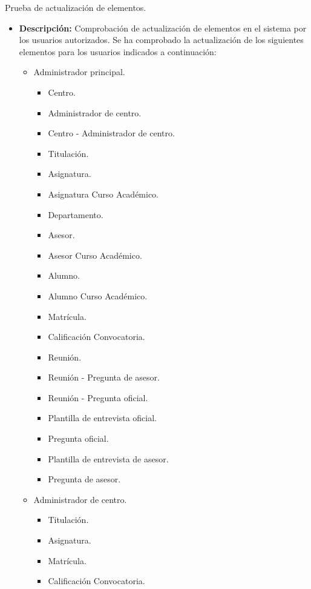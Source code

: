 \item Prueba de actualización de elementos.
  \begin{itemize}
    \item \textbf{Descripción:} Comprobación de actualización de elementos
    en el sistema por los usuarios autorizados. Se ha comprobado la
    actualización de los siguientes elementos para los usuarios indicados a
    continuación:

    \begin{itemize}
      \item Administrador principal.
      \begin{itemize}
        \item Centro.
        \item Administrador de centro.
        \item Centro - Administrador de centro.
        \item Titulación.
        \item Asignatura.
        \item Asignatura Curso Académico.
        \item Departamento.
        \item Asesor.
        \item Asesor Curso Académico.
        \item Alumno.
        \item Alumno Curso Académico.
        \item Matrícula.
        \item Calificación Convocatoria.
        \item Reunión.
        \item Reunión - Pregunta de asesor.
        \item Reunión - Pregunta oficial.
        \item Plantilla de entrevista oficial.
        \item Pregunta oficial.
        \item Plantilla de entrevista de asesor.
        \item Pregunta de asesor.
      \end{itemize}
      \item Administrador de centro.
      \begin{itemize}
        \item Titulación.
        \item Asignatura.
        \item Matrícula.
        \item Calificación Convocatoria.

\end{itemize}
\end{itemize}
\end{itemize}
